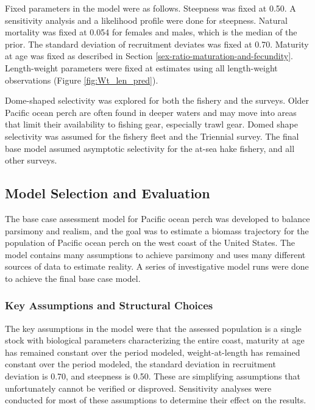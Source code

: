 \documentclass[12pt,]{article}
\begin{document}
Fixed parameters in the model were as follows. Steepness was fixed at
0.50. A sensitivity analysis and a likelihood profile were done for
steepness. Natural mortality was fixed at 0.054 for females and males,
which is the median of the prior. The standard deviation of recruitment
deviates was fixed at 0.70. Maturity at age was fixed as described in
Section \ref{sex-ratio-maturation-and-fecundity}. Length-weight
parameters were fixed at estimates using all length-weight observations
(Figure \ref{fig:Wt_len_pred}).

Dome-shaped selectivity was explored for both the fishery and the
surveys. Older Pacific ocean perch are often found in deeper waters and
may move into areas that limit their availability to fishing gear,
especially trawl gear. Domed shape selectivity was assumed for the
fishery fleet and the Triennial survey. The final base model assumed
asymptotic selectivity for the at-sea hake fishery, and all other
surveys.

\subsection{Model Selection and
Evaluation}\label{model-selection-and-evaluation}

The base case assessment model for Pacific ocean perch was developed to
balance parsimony and realism, and the goal was to estimate a biomass
trajectory for the population of Pacific ocean perch on the west coast
of the United States. The model contains many assumptions to achieve
parsimony and uses many different sources of data to estimate reality. A
series of investigative model runs were done to achieve the final base
case model.

\subsubsection{Key Assumptions and Structural
Choices}\label{key-assumptions-and-structural-choices}

The key assumptions in the model were that the assessed population is a
single stock with biological parameters characterizing the entire coast,
maturity at age has remained constant over the period modeled,
weight-at-length has remained constant over the period modeled, the
standard deviation in recruitment deviation is 0.70, and steepness is
0.50. These are simplifying assumptions that unfortunately cannot be
verified or disproved. Sensitivity analyses were conducted for most of
these assumptions to determine their effect on the results.
\end{document}
